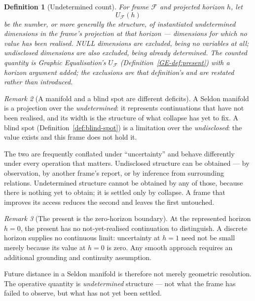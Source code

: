 \documentclass[11pt,a4paper]{article}
\newtheorem{definition}{Definition}[section]
\theoremstyle{remark}
\newtheorem{remark}[definition]{Remark}
\newcommand{\Frame}{\mathcal F}
\begin{document}
\begin{definition}[Undetermined count]\label{def:unknown-count}
For frame $\Frame$ and projected horizon $h$, let
\[
U_{\Frame}(h)
\]
be the number, or more generally the structure, of instantiated \emph{undetermined} dimensions in the frame's projection at that horizon --- dimensions for which no value has been realised. NULL dimensions are excluded, being no variables at all; \emph{undisclosed} dimensions are also excluded, being already determined. The counted quantity is Graphic Equalisation's $U_{\Frame}$ (Definition~\ref{GE-def:present}) with a horizon argument added; the exclusions are that definition's and are restated rather than introduced.
\end{definition}

\begin{remark}[A manifold and a blind spot are different deficits]\label{rem:two-deficits}
A Seldon manifold is a projection over the \emph{undetermined}: it represents continuations that have not been realised, and its width is the structure of what collapse has yet to fix. A blind spot (Definition~\ref{def:blind-spot}) is a limitation over the \emph{undisclosed}: the value exists and this frame does not hold it.

The two are frequently conflated under ``uncertainty'' and behave differently under every operation that matters. Undisclosed structure can be obtained --- by observation, by another frame's report, or by inference from surrounding relations. Undetermined structure cannot be obtained by any of those, because there is nothing yet to obtain; it is settled only by collapse. A frame that improves its access reduces the second and leaves the first untouched.
\end{remark}

\begin{remark}[The present is the zero-horizon boundary]\label{prop:present-limit}
At the represented horizon $h=0$, the present has no not-yet-realised
continuation to distinguish. A discrete horizon supplies no continuous
limit: uncertainty at $h=1$ need not be small merely because its value at
$h=0$ is zero. Any smooth approach requires an additional grounding and
continuity assumption.
\end{remark}

Future distance in a Seldon manifold is therefore not merely geometric resolution. The operative quantity is \emph{undetermined} structure --- not what the frame has failed to observe, but what has not yet been settled.
\end{document}
